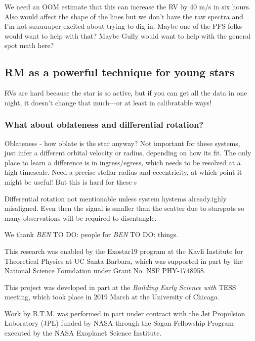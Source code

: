 \documentclass[twocolumn]{aastex62}
\newcommand{\todo}[3]{{\color{#2} \emph{#1} TO DO: #3}}
\newcommand{\btmtodo}[1]{\todo{BEN}{blue}{#1}}
\begin{document}
We need an OOM estimate that this can increase the RV by 40 m/s in six hours.
Also would affect the shape of the lines but we don't have the raw spectra and I'm not suuuuuper excited about trying to dig in. Maybe one of the PFS folks would want to help with that? 
Maybe Gully would want to help with the general spot math here?

\subsection{RM as a powerful technique for young stars}

RVs are hard because the star is so active, but if you can get all the data in one night, it doesn't change that much---or at least in calibratable ways!


\subsubsection{What about oblateness and differential rotation?}

Oblateness - how oblate is the star anyway?
Not important for these systems, just infer a different orbital velocity or radius, depending on how its fit. The only place to learn a difference is in ingress/egress, which needs to be resolved at a high timescale. Need a precise stellar radius and eccentricity, at which point it might be useful! But this is hard for these s


Differential rotation not mentionable unless system hystems already.ighly misaligned. Even then the signal is smaller than the scatter due to starspots so many observations will be required to disentangle.



\acknowledgements

We thank \btmtodo{people} for \btmtodo{things}.


This research was enabled by the Exostar19 program at the Kavli Institute for Theoretical Physics at UC Santa Barbara, which was supported in part by the National Science Foundation under Grant No. NSF PHY-1748958.

This project was developed in part at the \textit{Building Early Science with} TESS meeting, which took place in 2019 March at the University of Chicago.

Work by B.T.M. was performed in part under contract with the Jet
Propulsion Laboratory (JPL) funded by NASA through
the Sagan Fellowship Program executed by the NASA
Exoplanet Science Institute.
\end{document}
